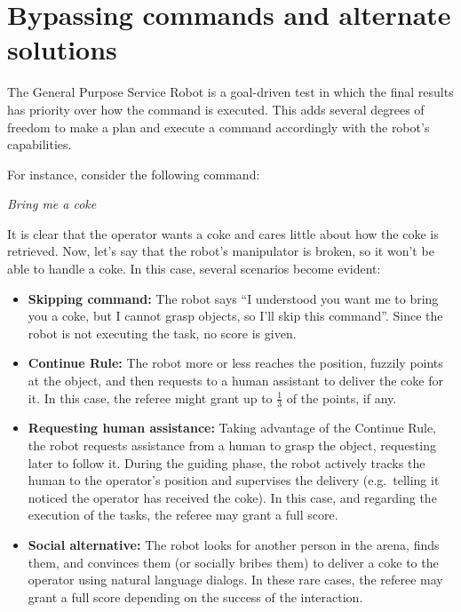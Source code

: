 \section{Bypassing commands and alternate solutions}
The General Purpose Service Robot is a goal-driven test in which the final results has priority over how the command is executed.
This adds several degrees of freedom to make a plan and execute a command accordingly with the robot's capabilities.

For instance, consider the following command:

\begin{center}
\noindent\textit{Bring me a coke}
\end{center}

It is clear that the operator wants a coke and cares little about how the coke is retrieved. Now, let's say that the robot's manipulator is broken, so it won't be able to handle a coke. In this case, several scenarios become evident:

\begin{itemize}
	\item \textbf{Skipping command:} The robot says \enquote{I understood you want me to bring you a coke, but I cannot grasp objects, so I'll skip this command}. Since the robot is not executing the task, no score is given.

	\item \textbf{Continue Rule:} The robot more or less reaches the position, fuzzily points at the object, and then requests to a human assistant to deliver the coke for it. In this case, the referee might grant up to $\frac{1}{3}$ of the points, if any.

	\item \textbf{Requesting human assistance:} Taking advantage of the Continue Rule, the robot requests assistance from a human to grasp the object, requesting later to follow it. During the guiding phase, the robot actively tracks the human to the operator's position and supervises the delivery (e.g.~telling it noticed the operator has received the coke). In this case, and regarding the execution of the tasks, the referee may grant a full score.

	\item \textbf{Social alternative:} The robot looks for another person in the arena, finds them, and convinces them (or socially bribes them) to deliver a coke to the operator using natural language dialogs. In these rare cases, the referee may grant a full score depending on the success of the interaction.
\end{itemize}
